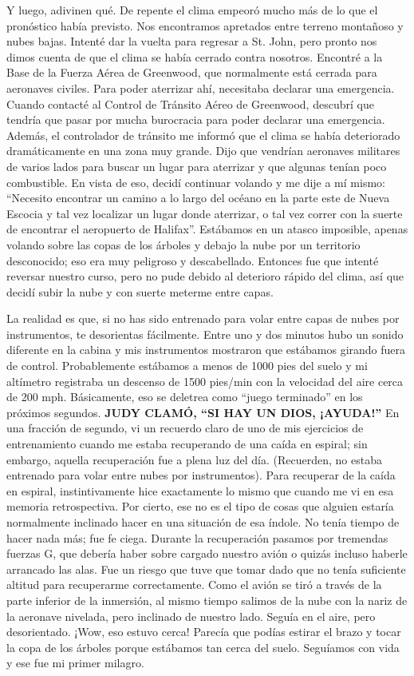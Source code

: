 \documentclass[twoside, 12pt]{book}
\begin{document}
Y luego, adivinen qué. De repente el clima empeoró mucho más de lo que el pronóstico había previsto. Nos encontramos apretados entre terreno montañoso y nubes bajas. Intenté dar la vuelta para regresar a St. John, pero pronto nos dimos cuenta de que el clima se había cerrado contra nosotros. Encontré a la Base de la Fuerza Aérea de Greenwood, que normalmente está cerrada para aeronaves civiles. Para poder aterrizar ahí, necesitaba declarar una emergencia. Cuando contacté al Control de Tránsito Aéreo de Greenwood, descubrí que tendría que pasar por mucha burocracia para poder declarar una emergencia. Además, el controlador de tránsito me informó que el clima se había deteriorado dramáticamente en una zona muy grande. Dijo que vendrían aeronaves militares de varios lados para buscar un lugar para aterrizar y que algunas tenían poco combustible. En vista de eso, decidí continuar volando y me dije a mí mismo: “Necesito encontrar un camino a lo largo del océano en la parte este de Nueva Escocia y tal vez localizar un lugar donde aterrizar, o tal vez correr con la suerte de encontrar el aeropuerto de Halifax”. Estábamos en un atasco imposible, apenas volando sobre las copas de los árboles y debajo la nube por un territorio desconocido; eso era muy peligroso y descabellado. Entonces fue que intenté reversar nuestro curso, pero no pude debido al deterioro rápido del clima, así que decidí subir la nube y con suerte meterme entre capas.

La realidad es que, si no has sido entrenado para volar entre capas de nubes por instrumentos, te desorientas fácilmente. Entre uno y dos minutos hubo un sonido diferente en la cabina y mis instrumentos mostraron que estábamos girando fuera de control. Probablemente estábamos a menos de 1000 pies del suelo y mi altímetro registraba un descenso de 1500 pies/min con la velocidad del aire cerca de 200 mph. Básicamente, eso se deletrea como “juego terminado” en los próximos segundos. \textbf{JUDY CLAMÓ, “SI HAY UN DIOS, ¡AYUDA!”} En una fracción de segundo, vi un recuerdo claro de uno de mis ejercicios de entrenamiento cuando me estaba recuperando de una caída en espiral; sin embargo, aquella recuperación fue a plena luz del día.  (Recuerden, no estaba entrenado para volar entre nubes por instrumentos). Para recuperar de la caída en espiral, instintivamente hice exactamente lo mismo que cuando me vi en esa memoria retrospectiva. Por cierto, ese no es el tipo de cosas que alguien estaría normalmente inclinado hacer en una situación de esa índole. No tenía tiempo de hacer nada más; fue fe ciega. Durante la recuperación pasamos por tremendas fuerzas G, que debería haber sobre cargado nuestro avión o quizás incluso haberle arrancado las alas. Fue un riesgo que tuve que tomar dado que no tenía suficiente altitud para recuperarme correctamente. Como el avión se tiró a través de la parte inferior de la inmersión, al mismo tiempo salimos de la nube con la nariz de la aeronave nivelada, pero inclinado de nuestro lado. Seguía en el aire, pero desorientado. ¡Wow, eso estuvo cerca! Parecía que podías estirar el brazo y tocar la copa de los árboles porque estábamos tan cerca del suelo. Seguíamos con vida y ese fue mi primer milagro.\\
\end{document}
